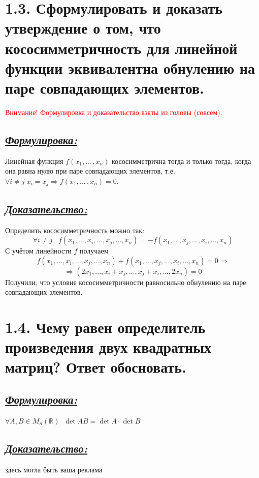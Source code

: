 \documentclass{article}
\begin{document}
\section*{\LARGE 1.3. Сформулировать и доказать утверждение о том, что кососимметричность для линейной функции эквивалентна обнулению на паре совпадающих элементов. }
\textcolor{red}{Внимание! Формулировка и доказательство взяты из головы (совсем). }
\subsection*{\Large \underline{\textit{Формулировка: }}}
Линейная функция $f(x_1, ...\,, x_n)$ кососимметрична тогда и только тогда, когда она равна нулю при паре совпадающих элементов, т.е. $\forall i \ne j \; x_i = x_j \Rightarrow f(x_1, ...\,, x_n) = 0$.

\subsection*{\Large \underline{\textit{Доказательство: }}}
Определить кососимметричность можно так:
$$ \forall i \ne j \;\;\; f(x_1, ..., x_i, ..., x_j, ..., x_n) = -f(x_1, ..., x_j, ..., x_i, ..., x_n) $$
С учётом линейности $f$ получаем
$$ f(x_1, ..., x_i, ..., x_j, ..., x_n) + f(x_1, ..., x_j, ..., x_i, ..., x_n) = 0 \Rightarrow$$
$$ \Rightarrow (2x_1, ..., x_i + x_j, ..., x_j + x_i, ..., 2x_n) = 0 $$
Получили, что условие кососимметричности равносильно обнулению на паре совпадающих элементов.

\section*{\LARGE 1.4. Чему равен определитель произведения двух квадратных матриц? Ответ обосновать. }
\subsection*{\Large \underline{\textit{Формулировка: }}}
$\forall A, B \in M_n(\mathbb{R}) \;\; \det{AB} = \det{A}\cdot\det{B}$

\subsection*{\Large \underline{\textit{Доказательство: }}}
здесь могла быть ваша реклама
\end{document}
